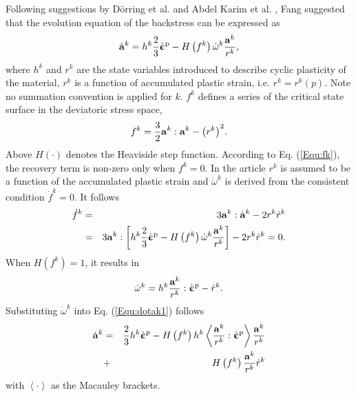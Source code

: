 \documentclass[preprint,5p,twocolumn,11pt,sort&compress]{elsarticle}
\newcommand{\dotbfepsilon}{{\dot{\bm{\upepsilon}}}}
\newcommand{\bfa}{{\bf a}}
\begin{document}
Following suggestions by D\"orring et al. \cite{Doerring2003} and Abdel Karim et al. \cite{AbdelKarim20051303}, Fang \cite{fang2015cyclic} suggested that the evolution equation of the backstress can be expressed as
\begin{equation}
\label{Equ:dotak1}
{\dot\bfa^k} = {h^k}\frac{2}{3}{\dotbfepsilon^{\rm p}} - H\left( {{f^k}} \right){\dot \omega ^k}\frac{{{\bfa^k}}}{{{r^k}}},
\end{equation}
where ${{{h}}^k} $ and ${{{r}}^k} $ are the state variables introduced to describe cyclic plasticity of the material, $r^k$ is a function of accumulated plastic strain, i.e. ${r^k} = {r^k}\left( p \right)$.  Note no summation convention is applied for $k$. ${{{f}}^k} $ defines a series of the critical state surface in the deviatoric stress space,
\begin{equation}
\label{Equ:fk}
{f^k} = \frac{3}{2}{\bfa^k}:{\bfa^k} - {\left( {{r^k}} \right)^2}.
\end{equation}
Above  $H(\cdot)$ denotes the Heaviside step function. According to Eq. (\ref{Equ:fk}), the recovery term is non-zero only when ${f^k} = 0$. In the article $r^k$ is assumed to be a function of the accumulated plastic strain and ${\dot \omega ^k}$ is derived from the consistent condition ${\dot f^k} = 0$. It follows
\begin{eqnarray}
\label{Equ:dotfk}
{\dot f^k} &=& 3{\bfa^k}:{\dot\bfa^k} - 2{r^k}{\dot r^k} \\ \nonumber
&=& 3{\bfa^k}:\left[ {{h^k}\frac{2}{3}{{\dotbfepsilon}^{\rm p}} - H\left( {{f^k}} \right){{\dot \omega }^k}\frac{{{\bfa^k}}}{{{r^k}}}} \right] - 2{r^k}{\dot r^k} = 0.
\end{eqnarray}
When $H\left( {{f^k}} \right) = 1$, it results in
\begin{equation}
\label{Equ:dotomegak}
{\dot \omega ^k} = {h^k}\frac{{{\bfa^k}}}{{{r^k}}}:{\dotbfepsilon^{\rm p}} - {\dot r^k}.
\end{equation}
Substituting ${\dot \omega ^k}$ into Eq. (\ref{Equ:dotak1}) follows
\begin{eqnarray}
\label{Equ:dotak2}\nonumber
{\dot\bfa^k} &=& \frac{2}{3}{h^k}{\dotbfepsilon^{\rm p}} - H\left( {{f^k}} \right){h^k}\left\langle {\frac{{{\bfa^k}}}{{{r^k}}}:{{\dotbfepsilon}^{\rm p}}} \right\rangle \frac{{{\bfa^k}}}{{{r^k}}} \\
&+& H\left( {{f^k}} \right)\frac{{{\bfa^k}}}{{{r^k}}}{\dot r^k}
\end{eqnarray}
with $\left<\cdot\right>$ as the Macauley brackets.
\end{document}
